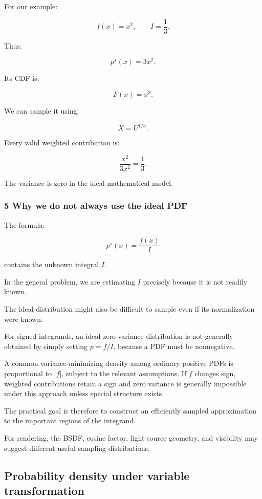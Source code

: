 For our example:

\[
 f(x)=x^2, \qquad I=\frac13.
\]

Thus:

\[
 \boxed{ p^\star(x)=3x^2 }.
\]

Its CDF is:

\[
 F(x)=x^3.
\]

We can sample it using:

\[
 \boxed{ X=U^{1/3} }.
\]

Every valid weighted contribution is:

\[
 \frac{x^2}{3x^2}=\frac13.
\]

The variance is zero in the ideal mathematical model.

\subsubsection{5 Why we do not always use the ideal PDF}\label{02-foundations-ii-ch029-why-we-do-not-always-use-the-ideal-pdf}

The formula:

\[
 p^\star(x)=\frac{f(x)}I
\]

contains the unknown integral \(I\).

In the general problem, we are estimating \(I\) precisely because it is not readily known.

The ideal distribution might also be difficult to sample even if its normalization were known.

For signed integrands, an ideal zero-variance distribution is not generally obtained by simply setting \(p=f/I\), because a PDF must be nonnegative.

A common variance-minimizing density among ordinary positive PDFs is proportional to \(|f|\), subject to the relevant assumptions. If \(f\) changes sign, weighted contributions retain a sign and zero variance is generally impossible under this approach unless special structure exists.

The practical goal is therefore to construct an efficiently sampled approximation to the important regions of the integrand.

For rendering, the BSDF, cosine factor, light-source geometry, and visibility may suggest different useful sampling distributions.

\subsection{Probability density under variable transformation}\label{02-foundations-ii-ch029-probability-density-under-variable-transformation}

